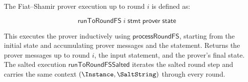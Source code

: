 \begin{definition}
    \label{def:prover_run_to_round_fs}
    The Fiat--Shamir prover execution up to round \(i\) is defined as:

    \begin{equation*} \mathsf{runToRoundFS} \;i \;\mathsf{stmt} \;\mathsf{prover} \;\mathsf{state} \end{equation*}

    This executes the prover inductively using \(\mathsf{processRoundFS}\), starting from the initial state and accumulating prover messages and the statement. Returns the prover messages up to round \(i\), the input statement, and the prover's final state.
    The salted execution \(\mathsf{runToRoundFSSalted}\) iterates the salted round step and
    carries the same context \((\Instance,\SaltString)\) through every round.
\end{definition}

